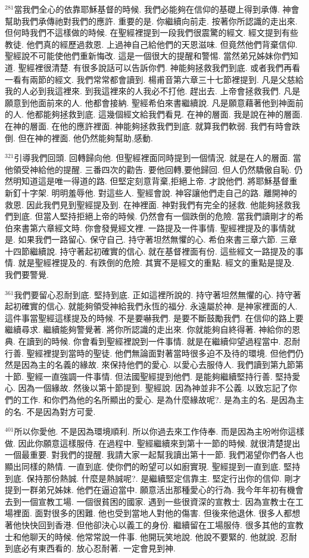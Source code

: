 \documentclass{book}
\begin{document}
$^{281}$當我們全心的依靠耶穌基督的時候.
我們必能夠在信仰的基礎上得到承傳.
神會幫助我們承傳祂對我們的應許.
重要的是.
你繼續向前走.
按著你所認識的走出來.
但何時我們不這樣做的時候.
在聖經裡提到一段我們很震驚的經文.
經文提到有些教徒.
他們真的經歷過救恩.
上過神自己給他們的天恩滋味.
但竟然他們背棄信仰.
聖經說不可能使他們重新悔改.
這是一個很大的提醒和警惕.
當然弟兄姊妹你們知道.
聖經裡很清楚.
有很多說話可以告訴你們.
神能夠拯救我們到底.
或者我們再看一看有兩節的經文.
我們常常都會讀到.
楊甫音第六章三十七節裡提到.
凡是父慈給我的人必到我這裡來.
到我這裡來的人我必不打他.
趕出去.
上帝會拯救我們.
凡是願意到他面前來的人.
他都會接納.
聖經希伯來書繼續說.
凡是願意藉著他到神面前的人.
他都能夠拯救到底.
這幾個經文給我們看見.
在神的層面.
我是說在神的層面.
在神的層面.
在他的應許裡面.
神能夠拯救我們到底.
就算我們軟弱.
我們有時會跌倒.
但在神的裡面.
他仍然能夠幫助,感動.

$^{321}$引導我們回頭.
回轉歸向他.
但聖經裡面同時提到一個情況.
就是在人的層面.
當他領受神給他的提醒.
三番四次的勸告.
要他回轉,要他歸回.
但人仍然驕傲自恥.
仍然明知道這是唯一得道的路.
但堅定刻意背棄,拒絕上帝.
才說他們.
將耶穌基督重新釘十字架.
明明羞辱他.
對這些人.
聖經會說.
神容讓他們走自己的路.
離開神的救恩.
因此我們見到聖經提及到.
在神裡面.
神對我們有完全的拯救.
他能夠拯救我們到底.
但當人堅持拒絕上帝的時候.
仍然會有一個跌倒的危險.
當我們讀剛才的希伯來書第六章經文時.
你會發覺經文裡.
一路提及一件事情.
聖經裡提及的事情就是.
如果我們一路留心.
保守自己.
持守著坦然無懼的心.
希伯來書三章六節.
三章十四節繼續說.
持守著起初確實的信心.
就在基督裡面有份.
這些經文一路提及的事情.
就是聖經裡提及的.
有跌倒的危險.
其實不是經文的重點.
經文的重點是提及.
我們要警覺.

$^{361}$我們要留心忍耐到底.
堅持到底.
正如這裡所說的.
持守著坦然無懼的心.
持守著起初確實的信心.
就能夠領受神給我們永恆的福分.
永遠屬於神.
是神家裡面的人.
這件事當聖經這樣提及的時候.
不是要嚇我們.
是要不斷鼓勵我們.
在信仰的路上要繼續尋求.
繼續能夠警覺著.
將你所認識的走出來.
你就能夠自終得著.
神給你的恩典.
在讀到的時候.
你會看到聖經裡說到一件事情.
就是在繼續仰望過程當中.
忍耐行善.
聖經裡提到當時的聖徒.
他們無論面對著當時很多迫不及待的環境.
但他們仍然是因為主的名義的緣故.
來保持他們的愛心.
以愛心去服侍人.
我們讀到第九節第十節.
聖經一直強調一件事情.
但法國聖經提到他們.
是能夠繼續堅持行善.
堅持愛心.
因為一個緣故.
然後以第十節提到.
聖經說.
因為神並非不公義.
以致忘記了你們的工作.
和你們為他的名所顯出的愛心.
是為什麼緣故呢?.
是為主的名.
是因為主的名.
不是因為對方可愛.

$^{401}$所以你愛他.
不是因為環境順利.
所以你過去來工作侍奉.
而是因為主吩咐你這樣做.
因此你願意這樣服侍.
在過程中.
聖經繼續來到第十一節的時候.
就很清楚提出一個最重要.
對我們的提醒.
我請大家一起幫我讀出第十一節.
我們渴望你們各人也顯出同樣的熱情.
一直到底.
使你們的盼望可以如廚實現.
聖經提到一直到底.
堅持到底.
保持那份熱誠.
什麼是熱誠呢?.
是繼續堅定信靠主.
堅定行出你的信仰.
剛才提到一群弟兄姊妹.
他們在逼迫當中.
願意活出那種愛心的行為.
我今年年初有機會去到一個宣教工場.
一個很貧困的國家.
遇到一些很資深的宣教士.
因為宣教士在工場裡面.
面對很多的困難.
他也受到當地人對他的傷害.
但後來他退休.
很多人都想著他快快回到香港.
但他卻決心以義工的身份.
繼續留在工場服侍.
很多其他的宣教士和他聊天的時候.
他常常說一件事.
他開玩笑地說.
他說不要緊的.
他就說.
忍耐到底必有東西看的.
放心忍耐著.
一定會見到神.
\end{document}
